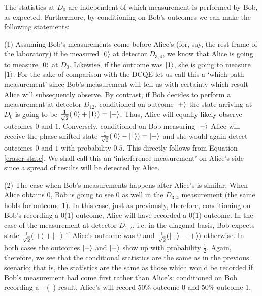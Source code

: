 \documentclass[11pt]{article}
\numberwithin{equation}{section}
\begin{document}
The statistics at $D_0$ are independent of which measurement is performed by Bob, as expected. Furthermore, by conditioning on Bob's outcomes we can make the following statements:

(1) Assuming Bob's measurements come before Alice's (for, say, the rest frame of the laboratory) if he measured $\ket{0}$ at detector $D_{3,4}$, we know that Alice is going to measure $\ket{0}$ at $D_0$. Likewise, if the outcome was $\ket{1}$, she is going to measure $\ket{1}$. For the sake of comparison with the DCQE let us call this a `which-path measurement' since Bob's measurement will tell us with certainty which result Alice will subsequently observe. By contrast, if Bob decides to perform a measurement at detector $D_{12}$, conditioned on outcome $\ket{+}$ the state arriving at $D_0$ is going to be $\frac{1}{\sqrt{2}}(\ket{0}+\ket{1})=\ket{+}$. Thus, Alice will equally likely observe outcomes $0$ and $1$.  Conversely, conditioned on Bob measuring $\ket{-}$ Alice will receive the phase shifted state $\frac{1}{\sqrt{2}}(\ket{0}-\ket{1})=\ket{-}$ and she would again detect outcomes $0$ and $1$ with probability $0.5$. This directly follows from Equation \ref{eraser state}. We shall call this an `interference measurement' on Alice's side since a spread of results will be detected by Alice. 

(2) The case when Bob's measurements happens after Alice's is similar: When Alice obtains $0$, Bob is going to see $0$ as well in the $D_{3,4}$ measurement (the same holds for outcome $1$). In this case, just as previously, therefore, conditioning on Bob's recording a 0(1) outcome, Alice will have recorded a 0(1) outcome. In the case of the measurement at detector $D_{1,2}$, i.e. in the diagonal basis, Bob expects state $\frac{1}{\sqrt{2}}(\ket{+}+\ket{-}$ if Alice's outcome was $0$ and $\frac{1}{\sqrt{2}}(\ket{+}-\ket{+})$ otherwise. In both cases the outcomes $\ket{+}$ and $\ket{-}$ show up with probability $\frac{1}{2}$. Again, therefore, we see that the conditional statistics are the same as in the previous scenario; that is, the statistics are the same as  those which would be recorded if Bob's measurement had come first rather than Alice's: conditioned on Bob recording a +(--) result, Alice's will record 50\% outcome 0 and 50\% outcome 1.
\end{document}
